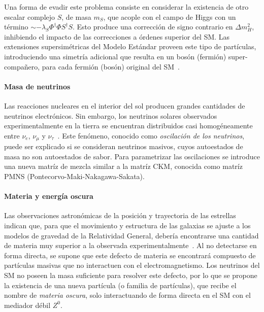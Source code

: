 Una forma de evadir este problema consiste en considerar la existencia de otro escalar complejo $S$, de masa $m_S$, que acople con el campo de Higgs con un término $\sim - \lambda_S \Phi^\dagger \Phi S^\dagger S$. Esto produce una corrección de signo contrario en $\Delta m_H^2$, inhibiendo el impacto de las correcciones a órdenes superior del SM. Las extensiones supersimétricas del Modelo Estándar proveen este tipo de partículas, introduciendo una simetría adicional que resulta en un bosón (fermión) super-compañero, para cada fermión (bosón) original del SM~\cite{Haber2018}.


\paragraph{Masa de neutrinos}

Las reacciones nucleares en el interior del sol producen grandes cantidades de neutrinos electrónicos. Sin embargo, los neutrinos solares observados experimentalmente en la tierra se encuentran distribuidos casi homogéneamente entre $\nu_e$, $\nu_\mu$ y $\nu_\tau$~\cite{TheSuper-KamiokandeCollaboration1998}. Este fenómeno, conocido como \textit{oscilación de los neutrinos}, puede ser explicado si se consideran neutrinos masivos, cuyos autoestados de masa no son autoestados de sabor. Para parametrizar las oscilaciones se introduce una nueva matríz de mezcla similar a la matríz CKM, conocida como matríz PMNS (Pontecorvo-Maki-Nakagawa-Sakata).


\paragraph{Materia y energía oscura}

Las observaciones astronómicas de la posición y trayectoria de las estrellas indican que, para que el movimiento y estructura de las galaxias se ajuste a los modelos de gravedad de la Relatividad General, debería encontrarse una cantidad de materia muy superior a la observada experimentalmente~\cite{Duda2011}. Al no detectarse en forma directa, se supone que este defecto de materia se encontrará compuesto de partículas masivas que no interactuen con el electromagnetismo. Los neutrinos del SM no poseen la masa suficiente para resolver este defecto, por lo que se propone la existencia de una nueva partícula (o familia de partículas), que recibe el nombre de \textit{materia oscura}, solo interactuando de forma directa en el SM con el mediador débil $Z^0$.

